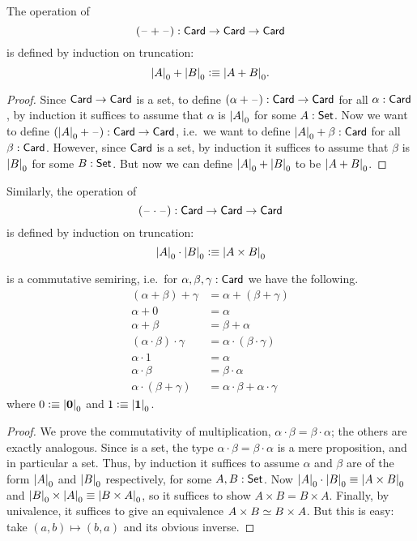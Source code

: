 \begin{defn}
  The operation of 
  \[ (\blank+\blank) : \card \to \card \to \card \]
  is defined by induction on truncation:
  \[ \cd{A} + \cd{B} \defeq \cd{A+B} .\]
\end{defn}
\begin{proof}
  Since $\card\to\card$ is a set, to define $(\alpha+\blank):\card\to\card$ for all $\alpha:\card$, by induction it suffices to assume that $\alpha$ is $\cd{A}$ for some $A:\set$.
  Now we want to define $(\cd{A}+\blank) :\card\to\card$, i.e.\ we want to define $\cd{A}+\beta :\card$ for all $\beta:\card$.
  However, since $\card$ is a set, by induction it suffices to assume that $\beta$ is $\cd{B}$ for some $B:\set$.
  But now we can define $\cd{A}+\cd{B}$ to be $\cd{A+B}$.
\end{proof}

\begin{defn}
  Similarly, the operation of 
  \[ (\blank\cdot\blank) : \card \to \card \to \card \]
  is defined by induction on truncation:
  \[ \cd{A} \cdot \cd{B} \defeq \cd{A\times B} \]
\end{defn}

\begin{lem}\label{card:semiring}
  \card is a commutative semiring, i.e.\ for $\alpha,\beta,\gamma:\card$ we have the following.
  \begin{align*}
    (\alpha+\beta)+\gamma &= \alpha+(\beta+\gamma)\\
    \alpha+0 &= \alpha\\
    \alpha + \beta &= \beta + \alpha\\
    (\alpha \cdot \beta) \cdot \gamma &= \alpha \cdot (\beta\cdot\gamma)\\
    \alpha \cdot 1 &= \alpha\\
    \alpha\cdot\beta &= \beta\cdot\alpha\\
    \alpha\cdot(\beta+\gamma) &= \alpha\cdot\beta + \alpha\cdot\gamma
  \end{align*}
  where $0 \defeq \cd{\emptyt}$ and $1\defeq\cd{\unit}$.
\end{lem}
\begin{proof}
  We prove the commutativity of multiplication, $\alpha\cdot\beta = \beta\cdot\alpha$; the others are exactly analogous.
  Since \card is a set, the type $\alpha\cdot\beta = \beta\cdot\alpha$ is a mere proposition, and in particular a set.
  Thus, by induction it suffices to assume $\alpha$ and $\beta$ are of the form $\cd{A}$ and $\cd{B}$ respectively, for some $A,B:\set$.
  Now $\cd{A}\cdot \cd{B} \jdeq \cd{A\times B}$ and $\cd{B}\times\cd{A} \jdeq \cd{B\times A}$, so it suffices to show $A\times B = B\times A$.
  Finally, by univalence, it suffices to give an equivalence $A\times B \eqvsym B\times A$.
  But this is easy: take $(a,b) \mapsto (b,a)$ and its obvious inverse.
\end{proof}

